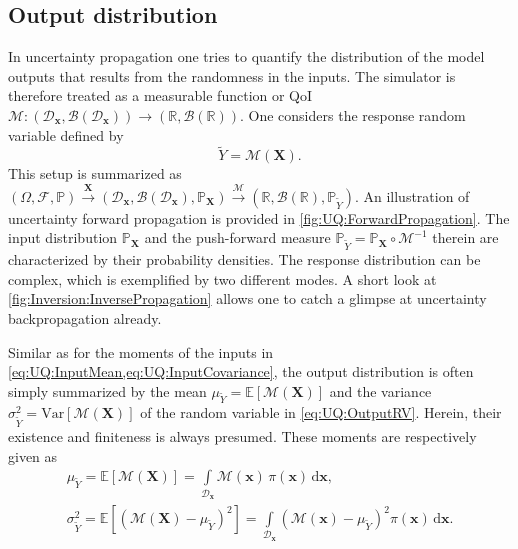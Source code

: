 \subsection{Output distribution}
In uncertainty propagation one tries to quantify the distribution of the model outputs that results from the randomness in the inputs.
The simulator is therefore treated as a measurable function or QoI
\(\mathcal{M} \colon (\mathcal{D}_{\bm{x}}, \mathcal{B}(\mathcal{D}_{\bm{x}})) \rightarrow (\mathds{R},\mathcal{B}(\mathds{R}))\).
One considers the response random variable defined by
\begin{equation} \label{eq:UQ:OutputRV}
  \tilde{Y} = \mathcal{M}(\bm{X}).
\end{equation}
This setup is summarized as \((\Omega, \mathcal{F}, \mathds{P}) \xrightarrow{\bm{X}} (\mathcal{D}_{\bm{x}}, \mathcal{B}(\mathcal{D}_{\bm{x}}), \mathds{P}_{\bm{X}})
\xrightarrow{\mathcal{M}} (\mathds{R}, \mathcal{B}(\mathds{R}), \mathds{P}_{\tilde{Y}})\).
An illustration of uncertainty forward propagation is provided in \cref{fig:UQ:ForwardPropagation}.
The input distribution \(\mathds{P}_{\bm{X}}\) and the push-forward measure \(\mathds{P}_{\tilde{Y}} = \mathds{P}_{\bm{X}} \circ \mathcal{M}^{-1}\)
therein are characterized by their probability densities.
The response distribution can be complex, which is exemplified by two different modes.
A short look at \cref{fig:Inversion:InversePropagation} allows one to catch a glimpse at uncertainty backpropagation already.
\par %
Similar as for the moments of the inputs in \cref{eq:UQ:InputMean,eq:UQ:InputCovariance},
the output distribution is often simply summarized by the mean \(\mu_{\tilde{Y}} = \mathds{E}[\mathcal{M}(\bm{X})]\)
and the variance \(\sigma_{\tilde{Y}}^2 = \mathrm{Var}[\mathcal{M}(\bm{X})]\) of the random variable in \cref{eq:UQ:OutputRV}.
Herein, their existence and finiteness is always presumed.
These moments are respectively given as
\begin{gather}
  \mu_{\tilde{Y}} = \mathds{E}[\mathcal{M}(\bm{X})] = \int\limits_{\mathcal{D}_{\bm{x}}} \mathcal{M}(\bm{x}) \, \pi(\bm{x}) \, \mathrm{d} \bm{x}, \label{eq:UQ:OutputMean} \\
  \sigma_{\tilde{Y}}^2 = \mathds{E} \left[ \left( \mathcal{M}(\bm{X}) - \mu_{\tilde{Y}} \right)^2 \right]
  = \int\limits_{\mathcal{D}_{\bm{x}}} \left( \mathcal{M}(\bm{x}) - \mu_{\tilde{Y}} \right)^2 \pi(\bm{x}) \, \mathrm{d} \bm{x}. \label{eq:UQ:OutputVariance}
\end{gather}
